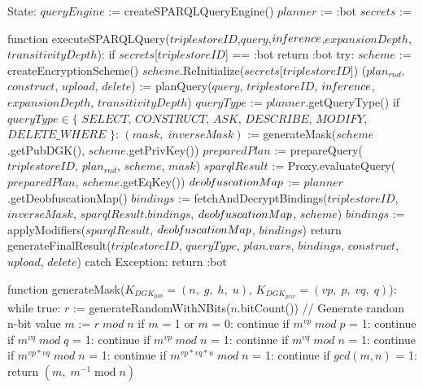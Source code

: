 State:
    $queryEngine$ := createSPARQLQueryEngine()
    $planner$ := :bot
    $secrets$ := {}

function executeSPARQLQuery($triplestoreID$,$query$,$in\textrm{\emph{f}}erence$,$expansionDepth$,$transitivityDepth$):
    if $secrets$[$triplestoreID$] == :bot
        return :bot
    try:
        $scheme$ := createEncryptionScheme()
        $scheme$.ReInitialize($secrets$[$triplestoreID$])
        ($plan_{rnd}$, $construct$, $upload$, $delete$) := planQuery($query$, $triplestoreID$, $in\textrm{\emph{f}}erence$, $expansionDepth$, $transitivityDepth$) 
        $queryType$ := $planner$.getQueryType()
        if $queryType \in \{$ $SELECT$, $CONSTRUCT$, $ASK$, $DESCRIBE$, $MODIFY$, $DELETE\_WHERE$ $\}$:
            $(mask, \; inverseMask)$ := generateMask($scheme$.getPubDGK(), $scheme$.getPrivKey())
            $preparedPlan$ := prepareQuery($triplestoreID$, $plan_{rnd}$, $scheme$, $mask$)
            $sparqlResult$ := Proxy.evaluateQuery($preparedPlan$, $scheme$.getEqKey())
            $deob\textrm{\emph{f}}uscationMap$ := $planner$.getDeobfuscationMap()
            $bindings$ := fetchAndDecryptBindings($triplestoreID$, $inverseMask$, $sparqlResult$.$bindings$, $deob\textrm{\emph{f}}uscationMap$, $scheme$)
            $bindings$ := applyModifiers($sparqlResult$, $deob\textrm{\emph{f}}uscationMap$, $bindings$)
        return generateFinalResult($triplestoreID$, $queryType$, $plan$.$vars$, $bindings$, $construct$, $upload$, $delete$)
    catch Exception:
        return :bot

function generateMask($K_{DGK_{pub}} = (n, \; g, \; h, \; u)$, $K_{DGK_{priv}} = (vp, \; p, \; vq, \; q)$):
    while true:
        $r$ := generateRandomWithNBits($n$.bitCount()) // Generate random n-bit value
        $m$ := $r \; mod \; n$
        if $m$ = 1 or $m$ = 0:
            continue
        if $m^{vp} \; mod \; p$ = 1:
            continue
        if $m^{vq} \; mod \; q$ = 1:
            continue
        if $m^{vp} \; mod \; n$ = 1:
            continue
        if $m^{vq} \; mod \; n$ = 1:
            continue
        if $m^{vp*vq} \; mod \; n$ = 1:
            continue
        if $m^{vp*vq*u} \; mod \; n$ = 1:
            continue
        if $gcd(m, n)$ = 1:
            return $(m, \; m^{-1} \; \textrm{mod} \; n)$